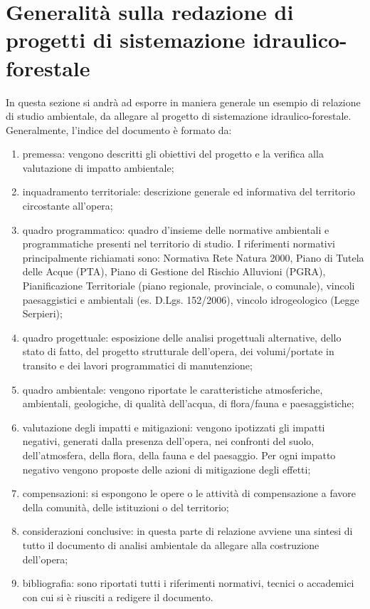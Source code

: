 \section{Generalità sulla redazione di progetti di sistemazione idraulico-forestale}
In questa sezione si andrà ad esporre in maniera generale un esempio di relazione di studio ambientale, da allegare al progetto di sistemazione idraulico-forestale.\\
Generalmente, l'indice del documento è formato da:
\begin{enumerate}
    \item premessa: vengono descritti gli obiettivi del progetto e la verifica alla valutazione di impatto ambientale;
    \item inquadramento territoriale: descrizione generale ed informativa del territorio circostante all'opera;
    \item quadro programmatico: quadro d'insieme delle normative ambientali e programmatiche presenti nel territorio di studio. I riferimenti normativi principalmente richiamati sono: Normativa Rete Natura 2000, Piano di Tutela delle Acque (PTA), Piano di Gestione del Rischio Alluvioni (PGRA), Pianificazione Territoriale (piano regionale, provinciale, o comunale), vincoli paesaggistici e ambientali (es. D.Lgs. 152/2006), vincolo idrogeologico (Legge Serpieri);
    \item quadro progettuale: esposizione delle analisi progettuali alternative, dello stato di fatto, del progetto strutturale dell'opera, dei volumi/portate in transito e dei lavori programmatici di manutenzione;
    \item quadro ambientale: vengono riportate le caratteristiche atmosferiche, ambientali, geologiche, di qualità dell'acqua, di flora/fauna e paesaggistiche;
    \item valutazione degli impatti e mitigazioni: vengono ipotizzati gli impatti negativi, generati dalla presenza dell'opera, nei confronti del suolo, dell'atmosfera, della flora, della fauna e del paesaggio. Per ogni impatto negativo vengono proposte delle azioni di mitigazione degli effetti;
    \item compensazioni: si espongono le opere o le attività di compensazione a favore della comunità, delle istituzioni o del territorio;
    \item considerazioni conclusive: in questa parte di relazione avviene una sintesi di tutto il documento di analisi ambientale da allegare alla costruzione dell'opera;
    \item bibliografia: sono riportati tutti i riferimenti normativi, tecnici o accademici con cui si è riusciti a redigere il documento.
\end{enumerate}
